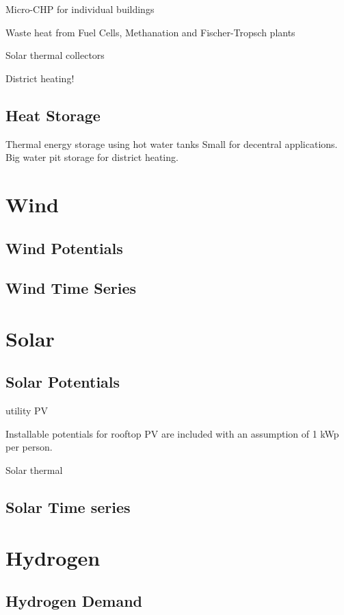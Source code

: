 Micro-CHP for individual buildings

Waste heat from Fuel Cells, Methanation and Fischer-Tropsch plants

Solar thermal collectors

District heating!

\subsection{Heat Storage}

Thermal energy storage using hot water tanks
Small for decentral applications.
Big water pit storage for district heating.

\section{Wind}

\subsection{Wind Potentials}

\subsection{Wind Time Series}

\section{Solar}

\subsection{Solar Potentials}

utility PV

Installable potentials for rooftop PV are included with an assumption of 1 kWp
per person.

Solar thermal

\subsection{Solar Time series}


\section{Hydrogen}

\subsection{Hydrogen Demand}


